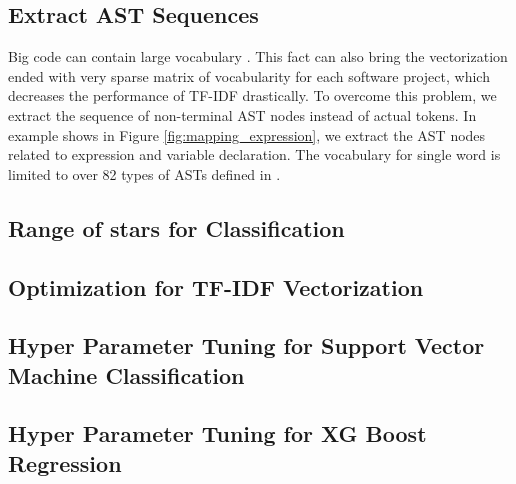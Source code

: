 \subsection{Extract AST Sequences}
Big code can contain large vocabulary \cite{015}. This fact can also bring the vectorization ended with very sparse matrix of vocabularity for each software project, which decreases the performance of TF-IDF drastically. To overcome this problem, we extract the sequence of non-terminal AST nodes instead of actual tokens. In example shows in Figure \ref{fig:mapping_expression}, we extract the AST nodes related to expression and variable declaration. The vocabulary for single word is limited to over 82 types of ASTs defined in \cite{007}.
\subsection{Range of stars for Classification}
\subsection{Optimization for TF-IDF Vectorization}
\subsection{Hyper Parameter Tuning for Support Vector Machine Classification}
\subsection{Hyper Parameter Tuning for XG Boost Regression}


